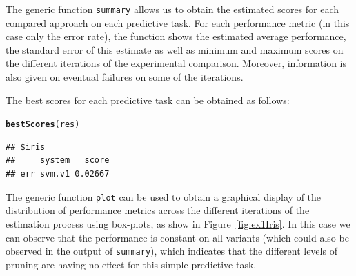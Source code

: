 \documentclass[10pt,a4paper]{article}\usepackage[]{graphicx}\usepackage[]{color}
\makeatletter
\newcommand{\hlstd}[1]{\textcolor[rgb]{0.345,0.345,0.345}{#1}}%
\newcommand{\hlkwd}[1]{\textcolor[rgb]{0.737,0.353,0.396}{\textbf{#1}}}%
\newenvironment{kframe}{%
 \def\at@end@of@kframe{}%
 \ifinner\ifhmode%
  \def\at@end@of@kframe{\end{minipage}}%
  \begin{minipage}{\columnwidth}%
 \fi\fi%
 \def\FrameCommand##1{\hskip\@totalleftmargin \hskip-\fboxsep
 \colorbox{shadecolor}{##1}\hskip-\fboxsep
     \hskip-\linewidth \hskip-\@totalleftmargin \hskip\columnwidth}%
 \MakeFramed {\advance\hsize-\width
   \@totalleftmargin\z@ \linewidth\hsize
   \@setminipage}}%
 {\par\unskip\endMakeFramed%
 \at@end@of@kframe}
\newenvironment{knitrout}{}{} %
\makeatother
\begin{document}
The generic function \texttt{summary} allows us to obtain the
estimated scores for each compared approach on each predictive
task. For each performance metric (in this case only the error rate),
the function shows the estimated average performance, the standard
error of this estimate as well as minimum and maximum scores on the
different iterations of the experimental comparison. Moreover,
information is also given on eventual failures on some of the
iterations.

The best scores for each predictive task can be obtained as follows:

\begin{knitrout}
\color{fgcolor}\begin{kframe}
\begin{alltt}
\hlkwd{bestScores}\hlstd{(res)}
\end{alltt}
\begin{verbatim}
## $iris
##     system   score
## err svm.v1 0.02667
\end{verbatim}
\end{kframe}
\end{knitrout}


The generic function \texttt{plot} can be used to obtain a graphical
display of the distribution of performance metrics across the
different iterations of the estimation process using box-plots, as
show in Figure~\ref{fig:ex1Iris}. In this case we can observe that the
performance is constant on all variants (which could also be observed
in the output of \texttt{summary}), which indicates that the different
levels of pruning are having no effect for this simple predictive
task.
\end{document}
